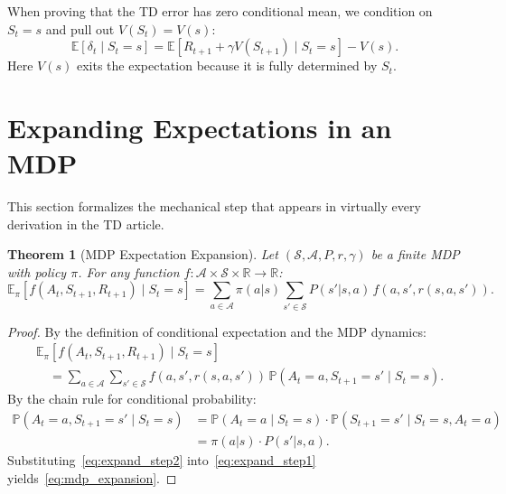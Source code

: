 \documentclass[11pt,a4paper]{article}
\theoremstyle{definition}
\theoremstyle{plain}
\newtheorem{theorem}{Theorem}[section]
\theoremstyle{remark}
\newcommand{\E}{\mathbb{E}}
\newcommand{\R}{\mathbb{R}}
\newcommand{\Prob}{\mathbb{P}}
\begin{document}
\begin{tdconnection}
When proving that the TD error has zero conditional mean, we condition on $S_t = s$ and pull out $V(S_t) = V(s)$:
\[
    \E[\delta_t \mid S_t = s] = \E[R_{t+1} + \gamma V(S_{t+1}) \mid S_t = s] - V(s).
\]
Here $V(s)$ exits the expectation because it is fully determined by $S_t$.
\end{tdconnection}

\section{Expanding Expectations in an MDP}
\label{sec:expanding}

This section formalizes the mechanical step that appears in virtually every derivation in the TD article.

\begin{theorem}[MDP Expectation Expansion]
\label{thm:mdp_expansion}
Let $(\mathcal{S}, \mathcal{A}, P, r, \gamma)$ be a finite MDP with policy $\pi$. For any function $f: \mathcal{A} \times \mathcal{S} \times \R \to \R$:
\begin{equation}
    \E_\pi[f(A_t, S_{t+1}, R_{t+1}) \mid S_t = s] = \sum_{a \in \mathcal{A}} \pi(a|s) \sum_{s' \in \mathcal{S}} P(s'|s,a)\, f(a, s', r(s,a,s')).
    \label{eq:mdp_expansion}
\end{equation}
\end{theorem}

\begin{proof}
By the definition of conditional expectation and the MDP dynamics:
\begin{align}
    &\E_\pi[f(A_t, S_{t+1}, R_{t+1}) \mid S_t = s] \nonumber\\
    &\quad= \sum_{a \in \mathcal{A}} \sum_{s' \in \mathcal{S}} f(a, s', r(s,a,s'))\, \Prob(A_t = a, S_{t+1} = s' \mid S_t = s). \label{eq:expand_step1}
\end{align}
By the chain rule for conditional probability:
\begin{align}
    \Prob(A_t = a, S_{t+1} = s' \mid S_t = s)
    &= \Prob(A_t = a \mid S_t = s) \cdot \Prob(S_{t+1} = s' \mid S_t = s, A_t = a) \nonumber\\
    &= \pi(a|s) \cdot P(s'|s,a). \label{eq:expand_step2}
\end{align}
Substituting~\eqref{eq:expand_step2} into~\eqref{eq:expand_step1} yields~\eqref{eq:mdp_expansion}.
\end{proof}
\end{document}
